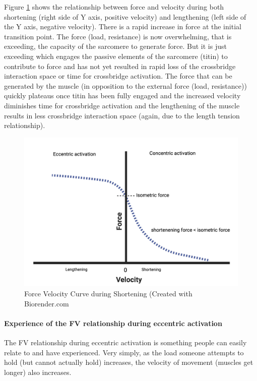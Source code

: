 Figure \ref{fig:force_velocity_lengthening} shows the relationship between force and velocity during both shortening (right side of Y axis, positive velocity) and lengthening (left side of the Y axis, negative velocity). There is a rapid increase in force at the initial transition point. The force (load, resistance) is now overwhelming, that is exceeding, the capacity of the sarcomere to generate force. But it is just exceeding which engages the passive elements of the sarcomere (titin) to contribute to force and has not yet resulted in rapid loss of the crossbridge interaction space or time for crossbridge activation. The force that can be generated by the muscle (in opposition to the external force (load, resistance)) quickly plateaus once titin has been fully engaged and the increased velocity diminishes time for crossbridge activation and the lengthening of the muscle results in less crossbridge interaction space (again, due to the length tension relationship). 


\begin{figure}[!ht]
    \centering
    \includegraphics[width=1\linewidth]{./figure/force_velocity_lengthening.png}
    \caption{Force Velocity Curve during Shortening \footnotesize{(Created with Biorender.com}}
    \label{fig:force_velocity_lengthening}
\end{figure}


\paragraph{Experience of the FV relationship during eccentric activation}

The FV relationship during eccentric activation is something people can easily relate to and have experienced. Very simply, as the load someone attempts to hold  (but cannot actually hold) increases, the velocity of movement (muscles get longer) also increases.

